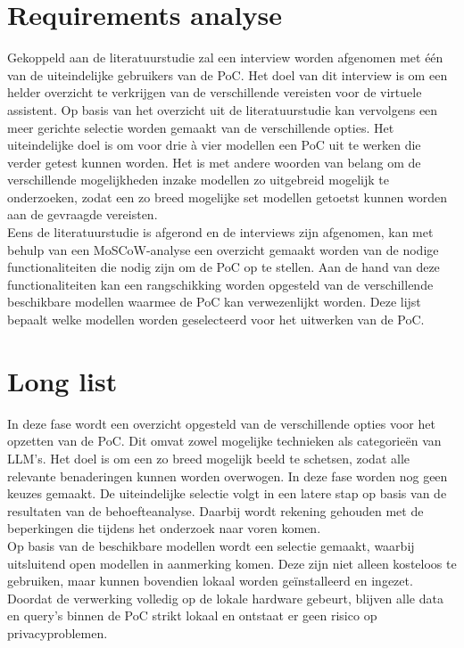 \section{Requirements analyse}

Gekoppeld aan de literatuurstudie zal een interview worden afgenomen met één van de uiteindelijke gebruikers van de PoC. Het doel van dit interview is om een helder overzicht te verkrijgen van de verschillende vereisten voor de virtuele assistent. Op basis van het overzicht uit de literatuurstudie kan vervolgens een meer gerichte selectie worden gemaakt van de verschillende opties. Het uiteindelijke doel is om voor drie à vier modellen een PoC uit te werken die verder getest kunnen worden. Het is met andere woorden van belang om de verschillende mogelijkheden inzake modellen zo uitgebreid mogelijk te onderzoeken, zodat een zo breed mogelijke set modellen getoetst kunnen worden aan de gevraagde vereisten. 
\\[1em]
Eens de literatuurstudie is afgerond en de interviews zijn afgenomen, kan met behulp van een MoSCoW-analyse een overzicht gemaakt worden van de nodige functionaliteiten die nodig zijn om de PoC op te stellen. Aan de hand van deze functionaliteiten kan een rangschikking worden opgesteld van de verschillende beschikbare modellen waarmee de PoC kan verwezenlijkt worden. Deze lijst bepaalt welke modellen worden geselecteerd voor het uitwerken van de PoC.

\section{Long list}

In deze fase wordt een overzicht opgesteld van de verschillende opties voor het opzetten van de PoC. Dit omvat zowel mogelijke technieken als categorieën van LLM’s. Het doel is om een zo breed mogelijk beeld te schetsen, zodat alle relevante benaderingen kunnen worden overwogen. In deze fase worden nog geen keuzes gemaakt. De uiteindelijke selectie volgt in een latere stap op basis van de resultaten van de behoefteanalyse. Daarbij wordt rekening gehouden met de beperkingen die tijdens het onderzoek naar voren komen.
\\[1em]
Op basis van de beschikbare modellen wordt een selectie gemaakt, waarbij uitsluitend open modellen in aanmerking komen. Deze zijn niet alleen kosteloos te gebruiken, maar kunnen bovendien lokaal worden geïnstalleerd en ingezet. Doordat de verwerking volledig op de lokale hardware gebeurt, blijven alle data en query’s binnen de PoC strikt lokaal en ontstaat er geen risico op privacyproblemen.

